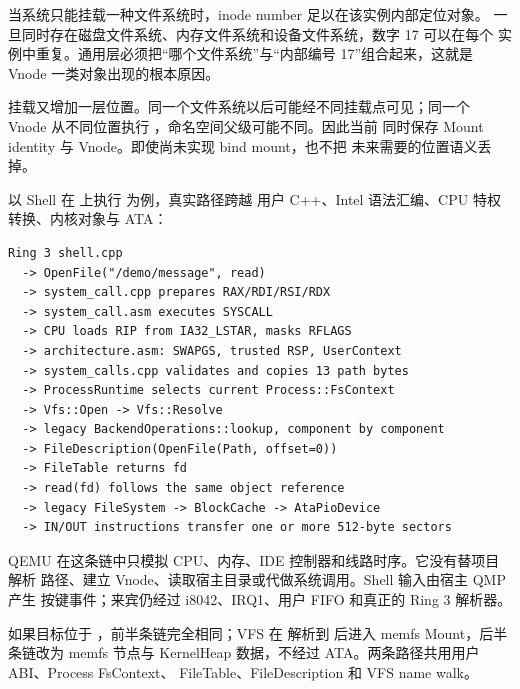 当系统只能挂载一种文件系统时，inode number 足以在该实例内部定位对象。
一旦同时存在磁盘文件系统、内存文件系统和设备文件系统，数字 17 可以在每个
实例中重复。通用层必须把“哪个文件系统”与“内部编号 17”组合起来，这就是
Vnode 一类对象出现的根本原因。

挂载又增加一层位置。同一个文件系统以后可能经不同挂载点可见；同一个 Vnode
从不同位置执行 ，命名空间父级可能不同。因此当前 
同时保存 Mount identity 与 Vnode。即使尚未实现 bind mount，也不把
未来需要的位置语义丢掉。

以 Shell 在  上执行  为例，真实路径跨越
用户 C++、Intel 语法汇编、CPU 特权转换、内核对象与 ATA：

\begin{lstlisting}[caption={文件读取经过 VFS 的路径}]
Ring 3 shell.cpp
  -> OpenFile("/demo/message", read)
  -> system_call.cpp prepares RAX/RDI/RSI/RDX
  -> system_call.asm executes SYSCALL
  -> CPU loads RIP from IA32_LSTAR, masks RFLAGS
  -> architecture.asm: SWAPGS, trusted RSP, UserContext
  -> system_calls.cpp validates and copies 13 path bytes
  -> ProcessRuntime selects current Process::FsContext
  -> Vfs::Open -> Vfs::Resolve
  -> legacy BackendOperations::lookup, component by component
  -> FileDescription(OpenFile(Path, offset=0))
  -> FileTable returns fd
  -> read(fd) follows the same object reference
  -> legacy FileSystem -> BlockCache -> AtaPioDevice
  -> IN/OUT instructions transfer one or more 512-byte sectors
\end{lstlisting}

QEMU 在这条链中只模拟 CPU、内存、IDE 控制器和线路时序。它没有替项目解析
路径、建立 Vnode、读取宿主目录或代做系统调用。Shell 输入由宿主 QMP 产生
按键事件；来宾仍经过 i8042、IRQ1、用户 FIFO 和真正的 Ring 3 解析器。

如果目标位于 ，前半条链完全相同；VFS 在
解析到  后进入 memfs Mount，后半条链改为 memfs 节点与
KernelHeap 数据，不经过 ATA。两条路径共用用户 ABI、Process FsContext、
FileTable、FileDescription 和 VFS name walk。

